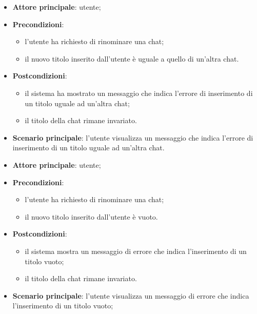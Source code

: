 \documentclass[10pt, a4paper]{article}
\begin{document}
    \begin{itemize}
        \item \textbf{Attore principale}: utente;
        \item \textbf{Precondizioni}: 
        \begin{itemize}
            \item l’utente ha richiesto di rinominare una chat;
            \item il nuovo titolo inserito dall'utente è uguale a quello di un'altra chat.
        \end{itemize}
        \item \textbf{Postcondizioni}: 
        \begin{itemize}
            \item il sistema ha mostrato un messaggio che indica l’errore di inserimento di un titolo uguale ad un’altra chat;
            \item il titolo della chat rimane invariato.
        \end{itemize}
        \item \textbf{Scenario principale}: l’utente visualizza un messaggio che indica l’errore di inserimento di un titolo uguale ad un’altra chat.
    \end{itemize}

    \begin{itemize}
        \item \textbf{Attore principale}: utente;
        \item \textbf{Precondizioni}:
        \begin{itemize}
            \item l’utente ha richiesto di rinominare una chat;
            \item il nuovo titolo inserito dall'utente è vuoto.
        \end{itemize}
        \item \textbf{Postcondizioni}: 
        \begin{itemize}
            \item il sistema mostra un messaggio di errore che indica l'inserimento di un titolo vuoto;
            \item il titolo della chat rimane invariato.
        \end{itemize}
        \item \textbf{Scenario principale}: l’utente visualizza un messaggio di errore che indica l’inserimento di un titolo vuoto;
    \end{itemize}
\end{document}
